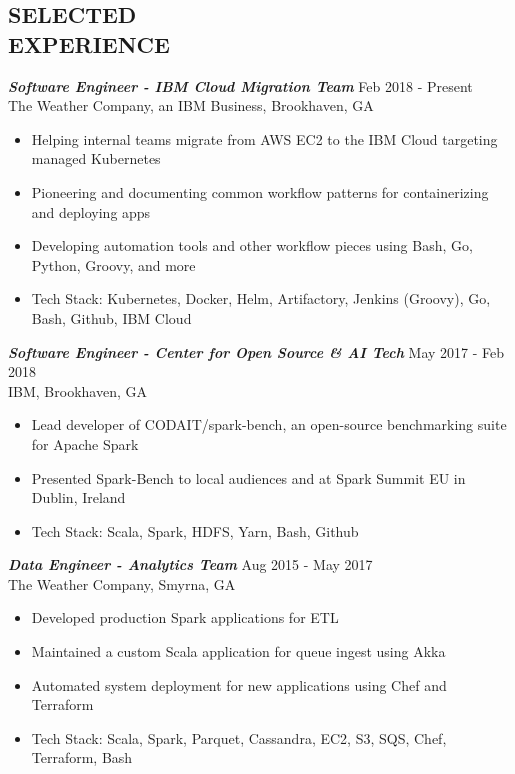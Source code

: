 \documentclass[margin]{res}
\begin{document}
\begin{resume}
\section{SELECTED \\ EXPERIENCE}
                {\sl \textbf{Software Engineer - IBM Cloud Migration Team}} \hfill Feb 2018 - Present \\
                  The Weather Company, an IBM Business, Brookhaven, GA
                \begin{itemize}  \itemsep -2pt %
                  \item Helping internal teams migrate from AWS EC2 to the IBM Cloud targeting managed Kubernetes
                  \item Pioneering and documenting common workflow patterns for containerizing and deploying apps
                  \item Developing automation tools and other workflow pieces using Bash, Go, Python, Groovy, and more
                  \item Tech Stack: Kubernetes, Docker, Helm, Artifactory, Jenkins (Groovy), Go, Bash, Github, IBM Cloud
                \end{itemize}

                {\sl \textbf{Software Engineer - Center for Open Source \& AI Tech}} \hfill May 2017 - Feb 2018 \\
                 IBM, Brookhaven, GA
                \begin{itemize}  \itemsep -2pt %
                  \item Lead developer of CODAIT/spark-bench, an open-source benchmarking suite for Apache Spark
                  \item Presented Spark-Bench to local audiences and at Spark Summit EU in Dublin, Ireland
                  \item Tech Stack: Scala, Spark, HDFS, Yarn, Bash, Github
                \end{itemize}

                {\sl \textbf{Data Engineer - Analytics Team }} \hfill Aug 2015 - May 2017 \\
                  The Weather Company, Smyrna, GA
                \begin{itemize}  \itemsep -2pt %
                  \item Developed production Spark applications for ETL
                  \item Maintained a custom Scala application for queue ingest using Akka
                  \item Automated system deployment for new applications using Chef and Terraform
                  \item Tech Stack: Scala, Spark, Parquet, Cassandra, EC2, S3, SQS, Chef, Terraform, Bash
                \end{itemize}


\end{resume}
\end{document}
